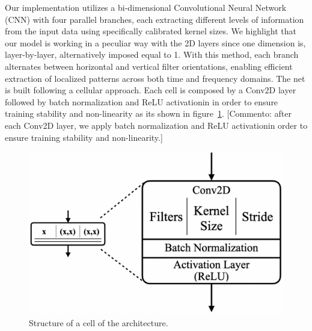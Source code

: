 \documentclass{article}
\begin{document}
\begin{sloppy}
Our implementation utilizes a bi-dimensional Convolutional Neural Network (CNN)
with four parallel branches, each extracting different levels of information from the
input data using specifically calibrated kernel sizes. 
We highlight that our model is working in a peculiar way with the 2D layers since one dimension is, layer-by-layer, alternatively
imposed equal to 1. With this method, each branch alternates between horizontal and vertical filter orientations,
enabling efficient extraction of localized patterns across both time and frequency domains.
The net is built following a cellular approach. Each cell is composed by a Conv2D layer followed by batch normalization and
ReLU activationin in order to ensure training stability and non-linearity as its shown in figure~\ref{fig:simple_cell}.
[Commento: after each Conv2D layer, we apply batch normalization and ReLU activationin order to ensure training stability and non-linearity.]
\begin{figure}[ht]
  \centering
  \centerline{\includegraphics[width=\columnwidth]{simple_cell.png}}
  \caption{Structure of a cell of the architecture.}
  \label{fig:simple_cell}
\end{figure}


\end{sloppy}
\end{document}

